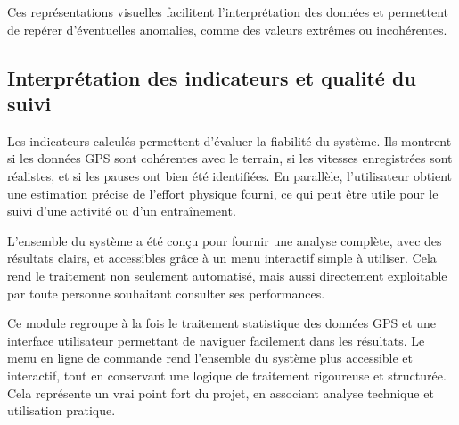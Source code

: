 \vspace{0.5em}

Ces représentations visuelles facilitent l’interprétation des données et permettent de repérer d’éventuelles anomalies, comme des valeurs extrêmes ou incohérentes.

\vspace{2em}

\subsection{Interprétation des indicateurs et qualité du suivi}

Les indicateurs calculés permettent d’évaluer la fiabilité du système. Ils montrent si les données GPS sont cohérentes avec le terrain, si les vitesses enregistrées sont réalistes, et si les pauses ont bien été identifiées. En parallèle, l’utilisateur obtient une estimation précise de l’effort physique fourni, ce qui peut être utile pour le suivi d’une activité ou d’un entraînement.

\vspace{1em}

L’ensemble du système a été conçu pour fournir une analyse complète, avec des résultats clairs, et accessibles grâce à un menu interactif simple à utiliser. Cela rend le traitement non seulement automatisé, mais aussi directement exploitable par toute personne souhaitant consulter ses performances.

\vspace{2em}

Ce module regroupe à la fois le traitement statistique des données GPS et une interface utilisateur permettant de naviguer facilement dans les résultats. Le menu en ligne de commande rend l’ensemble du système plus accessible et interactif, tout en conservant une logique de traitement rigoureuse et structurée. Cela représente un vrai point fort du projet, en associant analyse technique et utilisation pratique.

